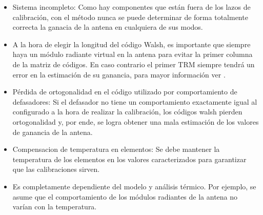 \begin{itemize}
	\item Sistema incompleto: Como hay componentes que están fuera de los lazos de calibración, con el método nunca se puede 
		determinar de forma totalmente correcta la ganacia de la antena en cualquiera de sus modos.
	\item A la hora de elegir la longitud del código Walsh, es importante que siempre haya un módulo radiante virtual en la 
		antena para evitar la primer columna de la matriz de códigos. En caso contrario el primer TRM siempre tendrá un error en 
		la estimación de su ganancia, para mayor información ver \cite{Wang2010}.
	\item Pérdida de ortogonalidad en el código utilizado por comportamiento de defasadores: Si el defasador no tiene un 
		comportamiento exactamente igual al configurado a la hora de realizar la calibración, los códigos walsh pierden 
		ortogonalidad y, por ende, se logra obtener una mala estimación de los valores de ganancia de la antena. 
    \item Compensacion de temperatura en elementos: Se debe mantener la temperatura de los elementos en los valores 
        caracterizados para garantizar que las calibraciones sirven.
    \item Es completamente dependiente del modelo y análisis térmico. Por ejemplo, se asume que el comportamiento de los 
        módulos radiantes de la antena no varían con la temperatura.
\end{itemize}

